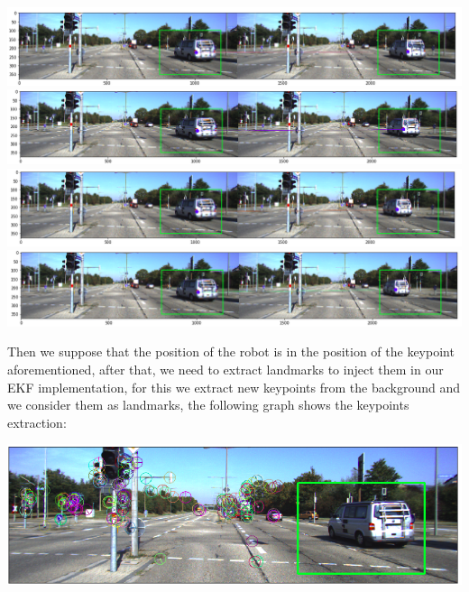 \documentclass[11pt,a4paper]{report}
\begin{document}
\begin{center}\label{fig2}
	\includegraphics[width=17cm]{Capture3.png}\\
	\includegraphics[width=17cm]{Capture4.png}\\
	\includegraphics[width=17cm]{Capture5.png}\\
	\includegraphics[width=17cm]{Capture6.png}
\end{center}
 
Then we suppose that the position of the robot is in the position of the keypoint aforementioned, after that, we need to extract landmarks to inject them in our EKF implementation, for this we extract new keypoints from the background and we consider them as landmarks, the following graph shows the keypoints extraction:
  
\begin{center}\label{fig3}
	\includegraphics[width=15cm]{Capture8.png}\\
\end{center}
\end{document}
